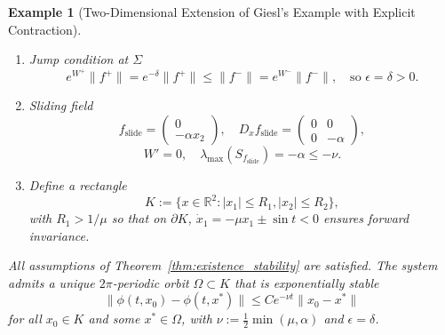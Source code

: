 \documentclass[11pt]{article}
\newtheorem{example}{Example}
\begin{document}
\begin{example}[Two-Dimensional Extension of Giesl’s Example \cite{giesl2005} with Explicit Contraction]
\begin{enumerate}
		\item[(A3)] Jump condition at $\Sigma$
		\[
		e^{W^+} \|f^+\| = e^{-\delta} \|f^+\| \leq \|f^-\| = e^{W^-} \|f^-\|, \quad \text{so } \epsilon = \delta > 0.
		\]
		
		\item[(A4)] Sliding field
		\[
		f_{\text{slide}} = \begin{pmatrix} 0 \\ -\alpha x_2 \end{pmatrix}, \quad D_x f_{\text{slide}} = \begin{pmatrix} 0 & 0 \\ 0 & -\alpha \end{pmatrix},
		\]
		\[
		W' = 0, \quad \lambda_{\max}(S_{f_{\text{slide}}}) = -\alpha \le -\nu.
		\]
		
		\item[(A5)] Define a rectangle
		\[
		K := \{x \in \mathbb{R}^2 : |x_1| \le R_1, |x_2| \le R_2 \},
		\]
		with $R_1 > 1/\mu$ so that on $\partial K$, $\dot{x}_1 = -\mu x_1 \pm \sin t < 0$ ensures forward invariance.
	\end{enumerate}
All assumptions of Theorem~\ref{thm:existence_stability} are satisfied. The system admits a unique $2\pi$-periodic orbit $\Omega \subset K$ that is exponentially stable
	\[
	\|\phi(t,x_0) - \phi(t,x^*)\| \le C e^{-\nu t} \|x_0 - x^*\|
	\]
	for all $x_0 \in K$ and some $x^* \in \Omega$, with $\nu := \tfrac{1}{2} \min(\mu,\alpha)$ and $\epsilon = \delta$.
\end{example}

\
\end{document}
